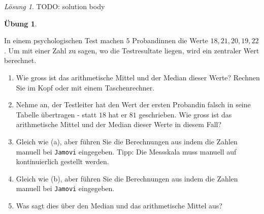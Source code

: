 \documentclass[
]{book}
\providecommand{\tightlist}{%
  \setlength{\itemsep}{0pt}\setlength{\parskip}{0pt}}
\theoremstyle{definition}
\theoremstyle{definition}
\theoremstyle{definition}
\newtheorem{exercise}{Übung}[chapter]
\theoremstyle{definition}
\theoremstyle{remark}
\newtheorem*{solution}{Lösung}
\begin{document}
\begin{solution}
TODO: solution body
\end{solution}

\begin{exercise}
\protect\hypertarget{exr:theorie-mdn-mean}{}\label{exr:theorie-mdn-mean}\leavevmode

In einem psychologischen Test machen \(5\) Probandinnen die Werte \(18, 21, 20, 19, 22\). Um mit einer Zahl zu sagen, wo die Testresultate liegen, wird ein zentraler Wert berechnet.

\begin{enumerate}
\def\labelenumi{(\alph{enumi})}
\tightlist
\item
  Wie gross ist das arithmetische Mittel und der Median dieser Werte? Rechnen Sie im Kopf oder mit einem Taschenrechner.
\item
  Nehme an, der Testleiter hat den Wert der ersten Probandin falsch in seine Tabelle übertragen - statt \(18\) hat er \(81\) geschrieben. Wie gross ist das arithmetische Mittel und der Median dieser Werte in diesem Fall?
\item
  Gleich wie (a), aber führen Sie die Berechnungen aus indem die Zahlen manuell bei \texttt{Jamovi} eingegeben. Tipp: Die Messskala muss manuell auf kontinuierlich gestellt werden.
\item
  Gleich wie (b), aber führen Sie die Berechnungen aus indem die Zahlen manuell bei \texttt{Jamovi} eingegeben.
\item
  Was sagt dies über den Median und das arithmetische Mittel aus?
\end{enumerate}

\end{exercise}
\end{document}
